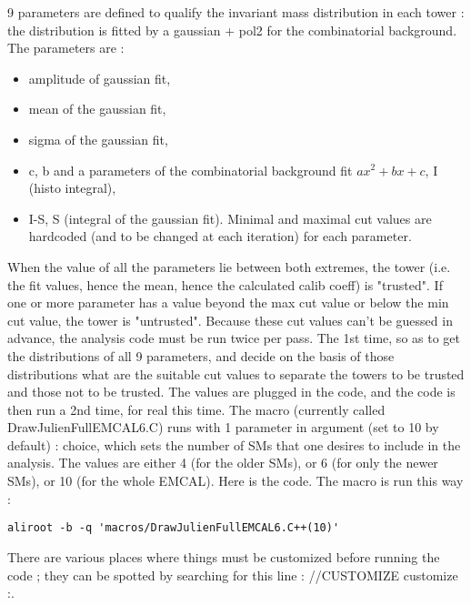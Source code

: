 9 parameters are defined to qualify the invariant mass distribution in each tower : the distribution is fitted by a gaussian + pol2 for the combinatorial background. The parameters are :
\begin{itemize}
\item amplitude of gaussian fit,
\item mean of the gaussian fit,
\item sigma of the gaussian fit,
\item c, b and a parameters of the combinatorial background fit $ax^2+bx+c$, I (histo integral),
\item I-S, S (integral of the gaussian fit). Minimal and maximal cut values are hardcoded (and to be changed at each iteration) for each parameter.
\end{itemize}
When the value of all the parameters lie between both extremes, the tower (i.e. the fit values, hence the mean, hence the calculated calib coeff) is "trusted". If one or more parameter has a value beyond the max cut value or below the min cut value, the tower is "untrusted".
Because these cut values can't be guessed in advance, the analysis code must be run twice per pass. The 1st time, so as to get the distributions of all 9 parameters, and decide on the basis of those distributions what are the suitable cut values to separate the towers to be trusted and those not to be trusted. The values are plugged in the code, and the code is then run a 2nd time, for real this time.
The macro (currently called DrawJulienFullEMCAL6.C) runs with 1 parameter in argument (set to 10 by default) : choice, which sets the number of SMs that one desires to include in the analysis. The values are either 4 (for the older SMs), or 6 (for only the newer SMs), or 10 (for the whole EMCAL). Here is the code. The macro is run this way :
\begin{lstlisting}
aliroot -b -q 'macros/DrawJulienFullEMCAL6.C++(10)'
\end{lstlisting}
There are various places where things must be customized before running the code ; they can be spotted by searching for this line : //CUSTOMIZE customize :.
